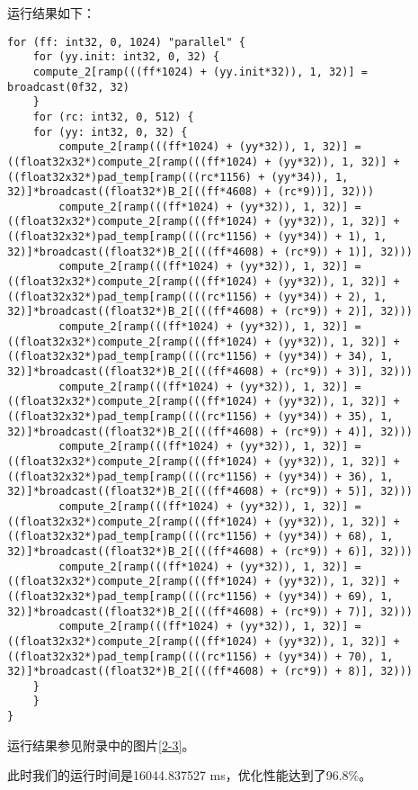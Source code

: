 运行结果如下：

\begin{lstlisting}[caption=大输入优化循环表达式，在test2.opt.ir文件中]
for (ff: int32, 0, 1024) "parallel" {
    for (yy.init: int32, 0, 32) {
    compute_2[ramp(((ff*1024) + (yy.init*32)), 1, 32)] = broadcast(0f32, 32)
    }
    for (rc: int32, 0, 512) {
    for (yy: int32, 0, 32) {
        compute_2[ramp(((ff*1024) + (yy*32)), 1, 32)] = ((float32x32*)compute_2[ramp(((ff*1024) + (yy*32)), 1, 32)] + ((float32x32*)pad_temp[ramp(((rc*1156) + (yy*34)), 1, 32)]*broadcast((float32*)B_2[((ff*4608) + (rc*9))], 32)))
        compute_2[ramp(((ff*1024) + (yy*32)), 1, 32)] = ((float32x32*)compute_2[ramp(((ff*1024) + (yy*32)), 1, 32)] + ((float32x32*)pad_temp[ramp((((rc*1156) + (yy*34)) + 1), 1, 32)]*broadcast((float32*)B_2[(((ff*4608) + (rc*9)) + 1)], 32)))
        compute_2[ramp(((ff*1024) + (yy*32)), 1, 32)] = ((float32x32*)compute_2[ramp(((ff*1024) + (yy*32)), 1, 32)] + ((float32x32*)pad_temp[ramp((((rc*1156) + (yy*34)) + 2), 1, 32)]*broadcast((float32*)B_2[(((ff*4608) + (rc*9)) + 2)], 32)))
        compute_2[ramp(((ff*1024) + (yy*32)), 1, 32)] = ((float32x32*)compute_2[ramp(((ff*1024) + (yy*32)), 1, 32)] + ((float32x32*)pad_temp[ramp((((rc*1156) + (yy*34)) + 34), 1, 32)]*broadcast((float32*)B_2[(((ff*4608) + (rc*9)) + 3)], 32)))
        compute_2[ramp(((ff*1024) + (yy*32)), 1, 32)] = ((float32x32*)compute_2[ramp(((ff*1024) + (yy*32)), 1, 32)] + ((float32x32*)pad_temp[ramp((((rc*1156) + (yy*34)) + 35), 1, 32)]*broadcast((float32*)B_2[(((ff*4608) + (rc*9)) + 4)], 32)))
        compute_2[ramp(((ff*1024) + (yy*32)), 1, 32)] = ((float32x32*)compute_2[ramp(((ff*1024) + (yy*32)), 1, 32)] + ((float32x32*)pad_temp[ramp((((rc*1156) + (yy*34)) + 36), 1, 32)]*broadcast((float32*)B_2[(((ff*4608) + (rc*9)) + 5)], 32)))
        compute_2[ramp(((ff*1024) + (yy*32)), 1, 32)] = ((float32x32*)compute_2[ramp(((ff*1024) + (yy*32)), 1, 32)] + ((float32x32*)pad_temp[ramp((((rc*1156) + (yy*34)) + 68), 1, 32)]*broadcast((float32*)B_2[(((ff*4608) + (rc*9)) + 6)], 32)))
        compute_2[ramp(((ff*1024) + (yy*32)), 1, 32)] = ((float32x32*)compute_2[ramp(((ff*1024) + (yy*32)), 1, 32)] + ((float32x32*)pad_temp[ramp((((rc*1156) + (yy*34)) + 69), 1, 32)]*broadcast((float32*)B_2[(((ff*4608) + (rc*9)) + 7)], 32)))
        compute_2[ramp(((ff*1024) + (yy*32)), 1, 32)] = ((float32x32*)compute_2[ramp(((ff*1024) + (yy*32)), 1, 32)] + ((float32x32*)pad_temp[ramp((((rc*1156) + (yy*34)) + 70), 1, 32)]*broadcast((float32*)B_2[(((ff*4608) + (rc*9)) + 8)], 32)))
    }
    }
}
\end{lstlisting}

运行结果参见附录中的图片\textcolor{MidnightBlue}{\ref{2-3}}。

此时我们的运行时间是16044.837527 ms，优化性能达到了96.8\%。
